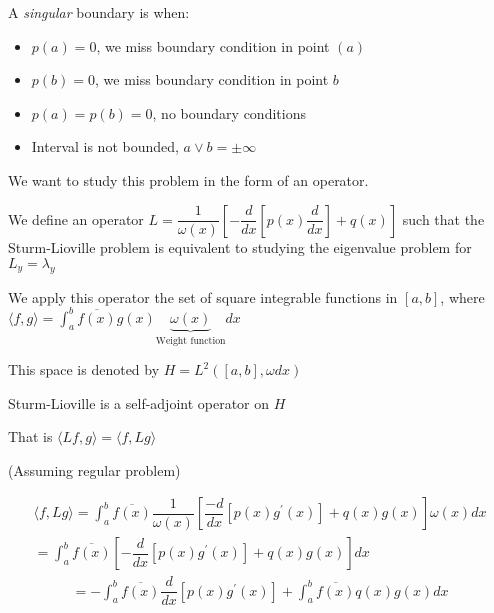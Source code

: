 \par\bigskip
\noindent A \textit{singular} boundary is when:\par
\begin{itemize}
  \item $p(a) = 0$, we miss boundary condition in point $(a)$
  \item $p(b) = 0$, we miss boundary condition in point $b$
  \item $p(a) = p(b) = 0$, no boundary conditions
  \item Interval is not bounded, $a\vee b = \pm\infty$
\end{itemize}
\par\bigskip
\noindent We want to study this problem in the form of an operator.\par
\noindent We define an operator $L = \dfrac{1}{\omega(x)}\left[-\dfrac{d}{dx}\left[p(x)\dfrac{d}{dx}\right]+q(x)\right]$ such that the Sturm-Lioville problem is equivalent to studying the eigenvalue problem for $L_y = \lambda_y$\par
\noindent We apply this operator the set of square integrable functions in $[a,b]$, where $\langle f,g \rangle = \int_{a}^{b}\overline{f(x)}g(x)\underbrace{\omega(x)}_{\text{Weight function}}dx$ \par
\noindent This space is denoted by $H = L^2([a,b], \omega dx)$
\par\bigskip
\begin{theo}[]{}
  Sturm-Lioville is a self-adjoint operator on $H$\par
  \noindent That is $\langle Lf,g\rangle = \langle f,Lg\rangle$
  \par\bigskip
  \noindent (Assuming regular problem) 
\end{theo}
\par\bigskip
\begin{prf}[]{}
  \begin{equation*}
    \begin{gathered}
      \langle f,Lg\rangle = \int_{a}^{b}\overline{f(x)}\dfrac{1}{\omega(x)}\left[\dfrac{-d}{dx}\left[p(x)g^{\prime}(x)\right]+q(x)g(x)\right]\omega(x)dx\\
      = \int_{a}^{b}\overline{f(x)}\left[-\dfrac{d}{dx}\left[p(x)g^{\prime}(x)\right]+q(x)g(x)\right]dx
    \end{gathered}
  \end{equation*}
  \begin{equation}
    \begin{gathered}
      = -\int_{a}^{b}\overline{f(x)}\dfrac{d}{dx}\left[p(x)g^{\prime}(x)\right]+\int_{a}^{b}\overline{f(x)}q(x)g(x)dx
    \end{gathered}
  \end{equation}
\end{prf}
